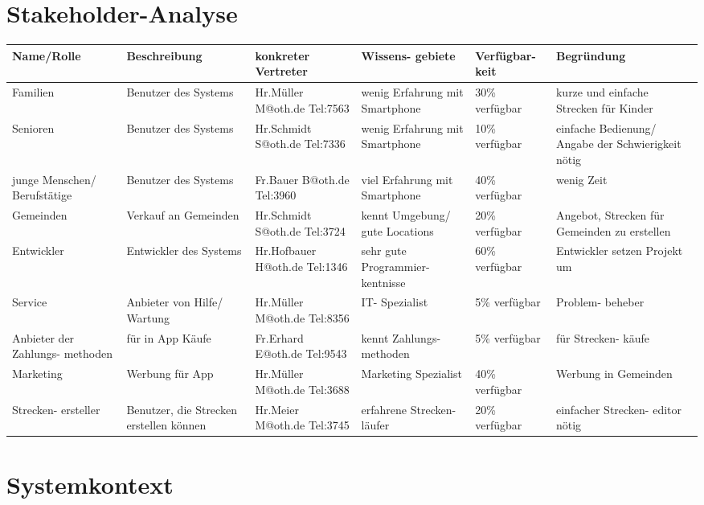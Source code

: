 \documentclass[a4paper, 12pt]{article}
\begin{document}
\section{Stakeholder-Analyse}

\begin{center}


\begin{tabular}{|p{2cm}|p{2cm}|p{2cm}|p{2cm}|p{2cm}|p{2cm}|}
\hline
Name/Rolle & Beschreibung & konkreter Vertreter & Wissens- gebiete & Verfügbar- keit & Begründung\\ \hline
Familien & Benutzer des Systems & Hr.Müller M@oth.de Tel:7563& wenig Erfahrung mit Smartphone & 30\% verfügbar & kurze und einfache Strecken für Kinder\\ \hline
Senioren & Benutzer des Systems & Hr.Schmidt S@oth.de Tel:7336 & wenig Erfahrung mit Smartphone & 10\% verfügbar & einfache Bedienung/ Angabe der Schwierigkeit nötig\\ \hline
junge Menschen/ Berufstätige & Benutzer des Systems & Fr.Bauer B@oth.de Tel:3960& viel Erfahrung mit Smartphone & 40\% verfügbar & wenig Zeit\\ \hline
Gemeinden & Verkauf an Gemeinden & Hr.Schmidt S@oth.de Tel:3724& kennt Umgebung/ gute Locations & 20\% verfügbar & Angebot, Strecken für Gemeinden zu erstellen\\ \hline
Entwickler & Entwickler des Systems & Hr.Hofbauer H@oth.de Tel:1346& sehr gute Programmier- kentnisse & 60\% verfügbar & Entwickler setzen Projekt um\\ \hline
Service & Anbieter von Hilfe/ Wartung & Hr.Müller M@oth.de Tel:8356& IT- Spezialist & 5\% verfügbar & Problem- beheber\\ \hline
Anbieter der Zahlungs- methoden & für in App Käufe & Fr.Erhard E@oth.de Tel:9543 & kennt Zahlungs- methoden & 5\% verfügbar & für Strecken- käufe\\ \hline
Marketing & Werbung für App & Hr.Müller M@oth.de Tel:3688 & Marketing Spezialist & 40\% verfügbar & Werbung in Gemeinden\\ \hline
Strecken- ersteller & Benutzer, die Strecken erstellen können & Hr.Meier M@oth.de Tel:3745& erfahrene Strecken- läufer & 20\% verfügbar & einfacher Strecken- editor nötig\\ \hline
\hline

\end{tabular}
\end{center}

\section{Systemkontext}
\end{document}
